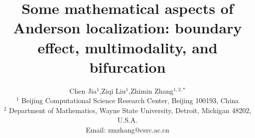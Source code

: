 \documentclass[a4paper,11pt]{article}
\newcommand{\paperfont}{\fontsize{11pt}{1.2\baselineskip}\selectfont}
\begin{document}
	
\theoremstyle{definition}
\makeatletter
\thm@headfont{\bf}
\makeatother
\newtheorem{theorem}{Theorem}[section]
\newtheorem{definition}[theorem]{Definition}
\newtheorem{lemma}[theorem]{Lemma}
\newtheorem{proposition}[theorem]{Proposition}
\newtheorem{corollary}[theorem]{Corollary}
\newtheorem{remark}[theorem]{Remark}
\newtheorem{example}[theorem]{Example}
\newtheorem{assumption}[theorem]{Assumption}

\lhead{}
\rhead{}
\lfoot{}
\rfoot{}

\renewcommand{\refname}{References}
\renewcommand{\figurename}{Figure}
\renewcommand{\tablename}{Table}
\renewcommand{\proofname}{Proof}

\newcommand{\diag}{\mathrm{diag}}
\newcommand{\tr}{\mathrm{tr}}
\newcommand{\Enum}{\mathbb{E}}
\newcommand{\Pnum}{\mathbb{P}}
\newcommand{\Rnum}{\mathbb{R}}
\newcommand{\Cnum}{\mathbb{C}}
\newcommand{\Znum}{\mathbb{Z}}
\newcommand{\Nnum}{\mathbb{N}}
\newcommand{\abs}[1]{\left\vert#1\right\vert}
\newcommand{\set}[1]{\left\{#1\right\}}
\newcommand{\norm}[1]{\left\Vert#1\right\Vert}
\newcommand{\bx}{\mathbf{x}}

\title{\textbf{Some mathematical aspects of Anderson localization: boundary effect, multimodality, and bifurcation}}
\author{Chen Jia$^{1}$,\;\;\;Ziqi Liu$^{1}$,\;\;\;Zhimin Zhang$^{1,2,*}$\\
\footnotesize $^1$ Beijing Computational Science Research Center, Beijing 100193, China \\
\footnotesize $^2$ Department of Mathematics, Wayne State University, Detroit, Michigan 48202, U.S.A.\\
\footnotesize Email: zmzhang@csrc.ac.cn}
\date{}
\maketitle
\thispagestyle{empty}

\paperfont
\end{document}
